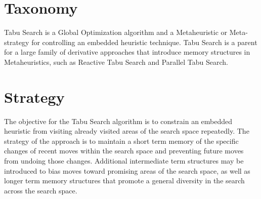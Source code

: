 \documentclass[a4paper, 11pt]{article}
\begin{document}
\section{Taxonomy}
\label{sec:taxonomy}
Tabu Search is a Global Optimization algorithm and a Metaheuristic or Meta-strategy for controlling an embedded heuristic technique. 
Tabu Search is a parent for a large family of derivative approaches that introduce memory structures in Metaheuristics, such as Reactive Tabu Search and Parallel Tabu Search.

\section{Strategy}
\label{sec:strategy}
The objective for the Tabu Search algorithm is to constrain an embedded heuristic from visiting already visited areas of the search space repeatedly. 
The strategy of the approach is to maintain a short term memory of the specific changes of recent moves within the search space and preventing future moves from undoing those changes. Additional intermediate term structures may be introduced to bias moves toward promising areas of the search space, as well as longer term memory structures that promote a general diversity in the search across the search space. 
\end{document}
